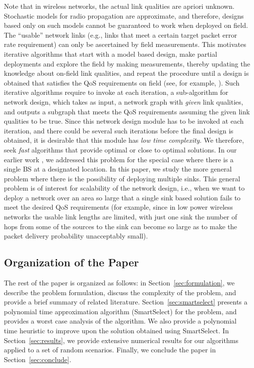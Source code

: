 \documentclass[conference]{IEEEtran}
\begin{document}
Note that in wireless networks, the actual link qualities are apriori unknown. Stochastic models for radio propagation are approximate, and therefore, designs based only on such models cannot be guaranteed to work when deployed on field. The ``usable'' network links (e.g., links that meet a certain target packet error rate requirement) can only be ascertained by field measurements. This motivates iterative algorithms that start with a model based design, make partial deployments and explore the field by making measurements, thereby updating the knowledge about on-field link qualities, and repeat the procedure until a design is obtained that satisfies the QoS requirements on field (see, for example, \cite{smartconnect-paper}). Such iterative algorithms require to invoke at each iteration, a sub-algorithm for network design, which takes as input, a network graph with \emph{given} link qualities, and outputs a subgraph that meets the QoS requirements assuming the given link qualities to be true. Since this network design module has to be invoked at each iteration, and there could be several such iterations before the final design is obtained, it is desirable that this module has \emph{low time complexity}. We therefore, seek \emph{fast} algorithms that provide optimal or close to optimal solutions. In our earlier work \cite{iwqos,fullpaper,smartconnect-paper}, we addressed this problem for the special case where there is a single BS at a designated location. In this paper, we study the more general problem where there is the possibility of deploying multiple sinks. This general problem is of interest for scalability of the network design, i.e., when we want to deploy a network over an area so large that a single sink based solution fails to meet the desired QoS requirements (for example, since in low power wireless networks the usable link lengths are limited, with just one sink the number of hops from some of the sources to the sink can become so large as to make the packet delivery probability unacceptably small).
 
\subsection{Organization of the Paper}
The rest of the paper is organized as follows: in Section~\ref{sec:formulation}, we describe the problem formulation, discuss the complexity of the problem, and provide a brief summary of related literature. Section~\ref{sec:smartselect} presents a polynomial time approximation algorithm (SmartSelect) for the problem, and provides a worst case analysis of the algorithm. We also provide a polynomial time heuristic to improve upon the solution obtained using SmartSelect. In Section~\ref{sec:results}, we provide extensive numerical results for our algorithms applied to a set of random scenarios. Finally, we conclude the paper in Section~\ref{sec:conclude}.
\end{document}
